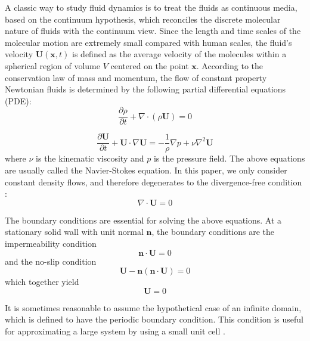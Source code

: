 A classic way to study fluid dynamics is to treat 
the fluids as continuous media, based on the continuum hypothesis, 
which reconciles the discrete molecular nature of fluids with the 
continuum view. Since the length and time scales of the molecular 
motion are extremely small compared with human scales, the fluid's velocity $\mathbf{U}(\mathbf{x}, t)$ is defined as the average velocity of the molecules within a spherical region of 
volume $V$ centered on the point $\mathbf{x}$. According to the conservation law of mass and momentum, the flow of constant property Newtonian fluids is determined by the 
following partial differential equations (PDE):
\begin{equation}
\frac{\partial\rho}{\partial t} + \nabla\cdot(\rho\mathbf{U}) = 0
\label{mass_eqn}
\end{equation} 

\begin{equation}
\frac{\partial\mathbf{U}}{\partial t} 
+ \mathbf{U}\cdot\nabla\mathbf{U} 
= -\frac{1}{\rho}\nabla p + \nu\nabla^2\mathbf{U}
\label{mom_eqn}
\end{equation}
where $\nu$ is the kinematic viscosity and $p$ is the pressure field. The above equations are usually called the Navier-Stokes equation. In this paper, we only consider constant density flows, and therefore  degenerates to the divergence-free condition \cite{blazek2015computational}:
\begin{equation}
\nabla\cdot\mathbf{U} = 0
\label{div_free}
\end{equation}

The boundary conditions are essential for solving the above equations. At a stationary solid wall with unit normal $\mathbf{n}$, 
the boundary conditions are the impermeability condition \cite{blazek2015computational}
\begin{equation}
\mathbf{n}\cdot\mathbf{U} = 0
\label{imperm_cond}
\end{equation}
and the no-slip condition \cite{blazek2015computational}
\begin{equation}
\mathbf{U}-\mathbf{n}(\mathbf{n}\cdot\mathbf{U}) = 0
\label{noslip_cond}
\end{equation}
which together yield
\begin{equation}
\mathbf{U} = 0
\label{stat_cond}
\end{equation}

It is sometimes reasonable to assume the hypothetical case of an infinite domain, which is defined to have the periodic boundary condition. This condition is useful for approximating a large system by using a small unit cell \cite{blazek2015computational}. 

